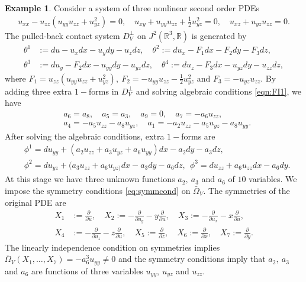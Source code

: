 \documentclass[a4paper, 11pt]{amsart}
\theoremstyle{definition}
\newtheorem{example}[theorem]{Example}
\begin{document}
\begin{example}

Consider a system of three nonlinear second order PDEs
\begin{align}
 u_{xx}-u_{zz}(u_{yy}u_{zz}+u_{yz}^2)=0,\quad  u_{xy}+u_{yy}u_{zz}+\frac{1}{2}u_{yz}^2=0,\quad  u_{xz}+u_{yz}u_{zz}=0.
\end{align}
The pulled-back contact system $D^{\perp}_V$ on $J^2({\mathbb{R}}^3,{\mathbb{R}})$ is generated by
\begin{align}
\theta^1&:=du-u_xdx-u_ydy-u_zdz,\quad \theta^2:=du_x-F_1dx-F_2dy-F_3dz,\nonumber\\
 \theta^3&:=du_y-F_2d x-u_{yy}dy-u_{yz}dz,\quad \theta^4:=du_z-F_3d x-u_{yz}dy-u_{zz}dz,\label{syscontact dist}
 \end{align}
where $F_1=u_{zz}(u_{yy}u_{zz}+u_{yz}^2),~F_2=-u_{yy}u_{zz}-\frac{1}{2}u_{yz}^2$ and $F_3=-u_{yz}u_{zz}.$  By adding three extra $1-$forms  in $D^{\perp}_V$ and solving algebraic conditions \eqref{eqn:FI1}, we have
\begin{align*}
&a_{6}  =a_{8},\quad a_5=a_3,\quad a_9=0,\quad a_7=-a_6u_{zz},\\
&a_4=-a_5u_{zz}-a_8u_{yz},\quad a_1= -a_2u_{zz}-a_5u_{yz}-a_8u_{yy}.
\end{align*}
After solving the algebraic conditions, extra $1-$forms are
\begin{align*}
  &\phi^1=du_{yy}+(a_2u_{zz}+a_3u_{yz}+a_6u_{yy})dx-a_2dy-a_3dz,\\
  &\phi^2=du_{yz}+(a_3u_{zz}+a_6u_{yz)}dx-a_3dy-a_6dz,~~\phi^3=du_{zz}+a_6u_{zz}dx-a_6dy.
\end{align*}
At this stage we have three unknown functions $a_2,~a_3$ and $a_6$ of $10$ variables. We impose the symmetry conditions \eqref{eq:symmcond} on $\bar{\Omega}_V.$ The symmetries of the original PDE are
\begin{align*}
X_1&:={\frac{\partial}{\partial{u}}},\quad X_2:=-{\frac{\partial}{\partial{u_y}}}-y{\frac{\partial}{\partial{u}}},\quad X_3:=-{\frac{\partial}{\partial{u_x}}}-x{\frac{\partial}{\partial{u}}},\\
X_4&:=-{\frac{\partial}{\partial{u_z}}}-z{\frac{\partial}{\partial{u}}},\quad X_5:={\frac{\partial}{\partial{z}}},\quad X_6:={\frac{\partial}{\partial{x}}},\quad X_7:={\frac{\partial}{\partial{y}}}.
\end{align*}
The linearly independence condition on symmetries implies $\bar{\Omega}_V(X_1,\ldots,X_7)=-a_6^3u_{yy}\neq 0$ and the symmetry conditions imply that $a_2,~a_3$ and $a_6$ are functions of three variables $u_{yy},~u_{yz}$ and $u_{zz}.$


\end{example}
\end{document}
